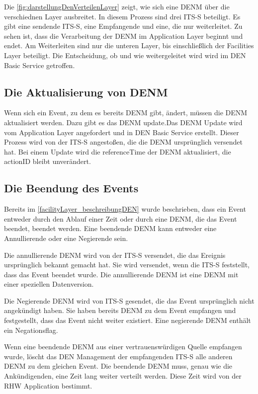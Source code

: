 Die \autoref{fig:darstellungDenVerteilenLayer} zeigt, wie sich eine \ac{DENM} über die verschiednen Layer ausbreitet. In diesem Prozess sind drei \ac{ITS-S} beteiligt. Es gibt eine sendende \ac{ITS-S}, eine Empfangende und eine, die nur weiterleitet. Zu sehen ist, dass die Verarbeitung der \ac{DENM} im Application Layer beginnt und endet. Am Weiterleiten sind nur die unteren Layer, bis einschließlich der Facilities Layer beteiligt. Die Entscheidung, ob und wie weitergeleitet wird wird im \ac{DEN} Basic Service getroffen. 

\subsection{Die Aktualisierung von DENM}
Wenn sich ein Event, zu dem es bereits \ac{DENM} gibt, ändert, müssen die \ac{DENM} aktualisiert werden. Dazu gibt es das \ac{DENM} update.Das \ac{DENM} Update wird vom Application Layer angefordert und in \ac{DEN} Basic Service erstellt. Dieser Prozess wird von der \ac{ITS-S} angestoßen, die die \ac{DENM} ursprünglich versendet hat. Bei einem Update wird die referenceTime der \ac{DENM} aktualisiert, die actionID bleibt unverändert. 

 
\subsection{Die Beendung des Events}
Bereits im \autoref{facilityLayer_beschreibungDEN} wurde beschrieben, dass ein Event entweder durch den Ablauf einer Zeit oder durch eine \ac{DENM}, die das Event beendet, beendet werden. Eine beendende \ac{DENM} kann entweder eine Annullierende oder eine Negierende sein. 

Die annullierende \ac{DENM} wird von der \ac{ITS-S} versendet, die das Ereignis ursprünglich bekannt gemacht hat. Sie wird versendet, wenn die \ac{ITS-S} feststellt, dass das Event beendet wurde.  Die annullierende \ac{DENM} ist eine \ac{DENM} mit einer speziellen Datenversion.

Die Negierende \ac{DENM} wird von \ac{ITS-S} gesendet, die das Event ursprünglich nicht angekündigt haben. Sie haben bereits \ac{DENM} zu dem Event empfangen und festgestellt, dass das Event nicht weiter existiert. Eine negierende \ac{DENM} enthält ein Negationsflag. 

Wenn eine beendende \ac{DENM} aus einer vertrauenswürdigen Quelle empfangen wurde, löscht das \ac{DEN} Management der empfangenden \ac{ITS-S} alle anderen \ac{DENM} zu dem gleichen Event. Die beendende \ac{DENM} muss, genau wie die Ankündigenden, eine Zeit lang weiter verteilt werden. Diese Zeit wird von der \ac{RHW} Application bestimmt.

